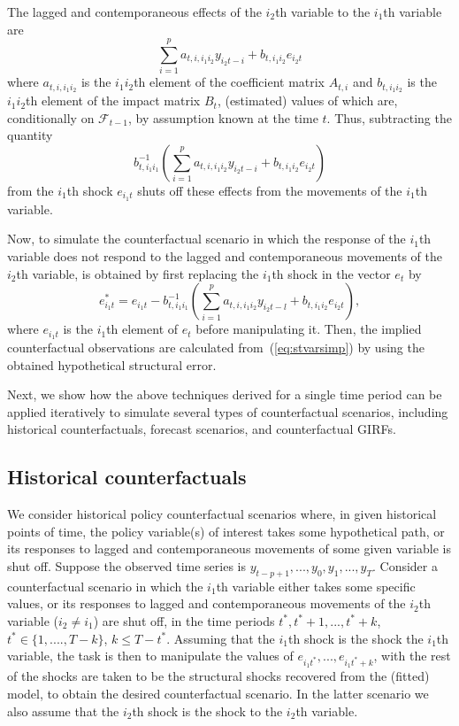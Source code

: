 \documentclass[nojss]{jss}
\begin{document}
The lagged and contemporaneous effects of the $i_2$th variable to the $i_1$th variable are
\begin{equation}\label{eq:i2effects}
\sum_{i=1}^p a_{t,i,i_1i_2}y_{i_2t-i} + b_{t,i_1i_2}e_{i_2t}
\end{equation}
where $a_{t,i,i_1i_2}$ is the $i_1i_2$th element of the coefficient matrix $A_{t,i}$ and $b_{t,i_1i_2}$ is the $i_1i_2$th element of the impact matrix $B_t$, (estimated) values of which are, conditionally on $\mathcal{F}_{t-1}$, by assumption known at the time $t$. Thus, subtracting the quantity
\begin{equation}\label{eq:shut_e_t}
b_{t,i_1i_1}^{-1}\left(\sum_{i=1}^p a_{t,i,i_1i_2}y_{i_2t-i} + b_{t,i_1i_2}e_{i_2t}\right)
\end{equation}
from the $i_1$th shock $e_{i_1t}$ shuts off these effects from the movements of the $i_1$th variable.

Now, to simulate the counterfactual scenario in which the response of the $i_1$th variable does not respond to the lagged and contemporaneous movements of the $i_2$th variable, is obtained by first replacing the $i_1$th shock in the vector $e_t$ by
\begin{equation}
e_{i_1t}^* = e_{i_1t} - b_{t,i_1i_1}^{-1}\left(\sum_{i=1}^p a_{t,i,i_1i_2}y_{i_2t-l} + b_{t,i_1i_2}e_{i_2t}\right),
\end{equation}
where $e_{i_1t}$ is the $i_1$th element of $e_t$ before manipulating it. Then, the implied counterfactual observations are calculated from~(\ref{eq:stvarsimp}) by using the obtained hypothetical structural error.

Next, we show how the above techniques derived for a single time period can be applied iteratively to simulate several types of counterfactual scenarios, including historical counterfactuals, forecast scenarios, and counterfactual GIRFs.


\subsection{Historical counterfactuals}

We consider historical policy counterfactual scenarios where, in given historical points of time, the policy variable(s) of interest takes some hypothetical path, or its responses to lagged and contemporaneous movements of some given variable is shut off. Suppose the observed time series is $y_{t-p+1},...,y_0,y_1,...,y_T$. Consider a counterfactual scenario in which the $i_1$th variable either takes some specific values, or its responses to lagged and contemporaneous movements of the $i_2$th variable ($i_2\neq i_1$) are shut off, in the time periods $t^*, t^*+1,...,t^*+k$, $t^*\in\lbrace 1,....,T-k\rbrace$, $k\leq T - t^*$. Assuming that the $i_1$th shock is the shock the $i_1$th variable, the task is then to manipulate the values of $e_{i_1t^*},...,e_{i_1t^*+k}$, with the rest of the shocks are taken to be the structural shocks recovered from the (fitted) model, to obtain the desired counterfactual scenario. In the latter scenario we also assume that the $i_2$th shock is the shock to the $i_2$th variable.
\end{document}
